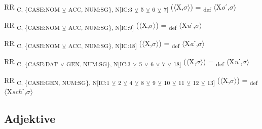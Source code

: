 {\begin{exe}
 RR \textsubscript{C, \{CASE:NOM} \textsubscript{${\veebar}$}\textsubscript{ ACC, NUM:SG\}, N[IC:3} \textsubscript{${\veebar}$}\textsubscript{ 5} \textsubscript{${\veebar}$}\textsubscript{ 6} \textsubscript{${\veebar}$}\textsubscript{ 7]} ($\langle$X,$\sigma $$\rangle$) = \textsubscript{def} $\langle$X\textit{o}ˊ,$\sigma $$\rangle$
\end{exe}

\begin{exe}
 RR \textsubscript{C, \{CASE:NOM} \textsubscript{${\veebar}$}\textsubscript{ ACC, NUM:SG\}, N[IC:9]} ($\langle$X,$\sigma $$\rangle$) = \textsubscript{def} $\langle$X\textit{u}ˊ,$\sigma $$\rangle$
\end{exe}

\begin{exe}
 RR \textsubscript{C, \{CASE:NOM} \textsubscript{${\veebar}$}\textsubscript{ ACC, NUM:SG\}, N[IC:18]} ($\langle$X,$\sigma $$\rangle$) = \textsubscript{def} $\langle$X\textit{a}ˊ,$\sigma $$\rangle$
\end{exe}

\begin{exe}
 RR \textsubscript{C, \{CASE:DAT} \textsubscript{${\veebar}$}\textsubscript{ GEN, NUM:SG\}, N[IC:3} \textsubscript{${\veebar}$}\textsubscript{ 5} \textsubscript{${\veebar}$}\textsubscript{ 6} \textsubscript{${\veebar}$}\textsubscript{ 7} \textsubscript{${\veebar}$}\textsubscript{ 18]} ($\langle$X,$\sigma $$\rangle$) = \textsubscript{def} $\langle$X\textit{u}ˊ,$\sigma $$\rangle$
\end{exe}

\begin{exe}
 RR \textsubscript{C, \{CASE:GEN, NUM:SG\}, N[IC:1} \textsubscript{${\veebar}$}\textsubscript{ 2} \textsubscript{${\veebar}$}\textsubscript{ 4} \textsubscript{${\veebar}$}\textsubscript{ 8} \textsubscript{${\veebar}$}\textsubscript{ 9} \textsubscript{${\veebar}$}\textsubscript{ 10} \textsubscript{${\veebar}$}\textsubscript{ 11} \textsubscript{${\veebar}$}\textsubscript{ 12} \textsubscript{${\veebar}$}\textsubscript{ 13]} ($\langle$X,$\sigma $$\rangle$) = \textsubscript{def} $\langle$X\textit{sch}ˊ,$\sigma $$\rangle$
\end{exe}

\subsection{Adjektive}

}
